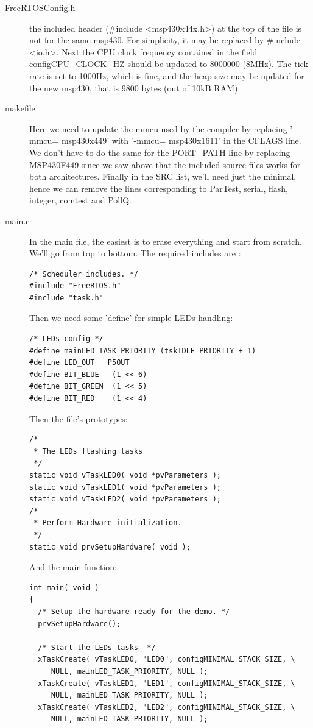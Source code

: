\documentclass[11pt]{report}
\begin{document}
\begin{description}
  \item[FreeRTOSConfig.h] the included header (\#include <msp430x44x.h>) at the top of the file is not for the same msp430. For simplicity, it may be replaced by \#include <io.h>. Next the CPU clock frequency contained in the field configCPU\_CLOCK\_HZ should be updated to 8000000 (8MHz). The tick rate is set to 1000Hz, which is fine, and the heap size may be updated for the new msp430, that is 9800 bytes (out of 10kB RAM).

  \item[makefile] Here we need to update the mmcu used by the compiler by replacing '-mmcu= msp430x449' with '-mmcu= msp430x1611' in the CFLAGS line. We don't have to do the same for the PORT\_PATH line by replacing MSP430F449 since we saw above that the included source files works for both architectures. Finally in the SRC list, we'll need just the minimal, hence we can remove the lines corresponding to ParTest, serial, flash, integer, comtest and PollQ.

  \item[main.c] In the main file, the easiest is to erase everything and start from scratch. We'll go from top to bottom. The required includes are :
\begin{verbatim}
/* Scheduler includes. */
#include "FreeRTOS.h"
#include "task.h"
\end{verbatim}

Then we need some 'define' for simple LEDs handling:
\begin{verbatim}
/* LEDs config */
#define mainLED_TASK_PRIORITY (tskIDLE_PRIORITY + 1)
#define LED_OUT   P5OUT
#define BIT_BLUE   (1 << 6)
#define BIT_GREEN  (1 << 5)
#define BIT_RED    (1 << 4)
\end{verbatim}

Then the file's prototypes:
\begin{verbatim}
/* 
 * The LEDs flashing tasks
 */ 
static void vTaskLED0( void *pvParameters );
static void vTaskLED1( void *pvParameters );
static void vTaskLED2( void *pvParameters );
/*
 * Perform Hardware initialization.
 */
static void prvSetupHardware( void );

\end{verbatim}
And the main function:
\begin{verbatim}
int main( void )
{
  /* Setup the hardware ready for the demo. */
  prvSetupHardware();
  
  /* Start the LEDs tasks  */
  xTaskCreate( vTaskLED0, "LED0", configMINIMAL_STACK_SIZE, \
     NULL, mainLED_TASK_PRIORITY, NULL );
  xTaskCreate( vTaskLED1, "LED1", configMINIMAL_STACK_SIZE, \
     NULL, mainLED_TASK_PRIORITY, NULL );
  xTaskCreate( vTaskLED2, "LED2", configMINIMAL_STACK_SIZE, \
     NULL, mainLED_TASK_PRIORITY, NULL );


\end{verbatim}
\end{description}
\end{document}
